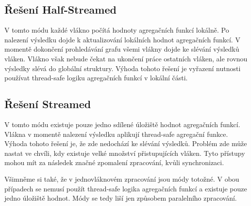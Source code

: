 \subsection{Řešení Half-Streamed}

V tomto módu každé vlákno počítá hodnoty agregačních funkcí lokálně.
Po nalezení výsledku dojde k aktualizování lokálních hodnot agregačních funkcí.
V momentě dokončení prohledávání grafu všemi vlákny dojde ke slévání výsledků vláken.
Vlákno však nebude čekat na ukončení práce ostatních vláken, ale rovnou výsledky slévá do globální struktury.
Výhoda tohoto řešení je vyřazení nutnosti používat thread-safe logiku agregačních funkcí v lokální části.

\subsection{Řešení Streamed}

V tomto módu existuje pouze jedno sdílené úložiště hodnot agregačních funkcí.
Vlákna v momentě nalezení výsledku aplikují thread-safe agregační funkce.
Výhoda tohoto řešení je, že zde nedochází ke slévání výsledků.
Problém zde může nastat ve chvíli, kdy existuje velké množství přistupujících vláken.
Tyto přístupy mohou mít za následek značné zpomalení zpracování, kvůli synchronizaci.

Všimněme si také, že v jednovláknovém zpracování jsou módy totožné.
V obou případech se nemusí použít thread-safe logika agregačních funkcí a existuje pouze jedno úložiště hodnot.
Módy se tedy liší jen způsobem paralelního zpracování.